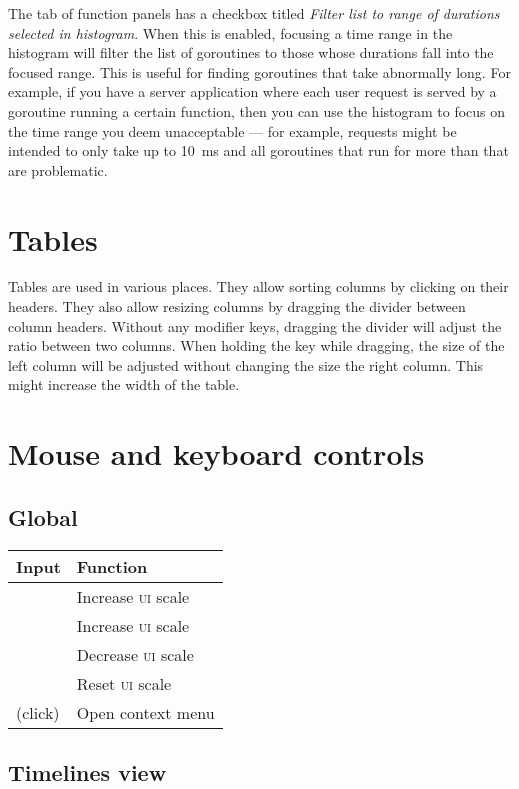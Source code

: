 \documentclass[10pt,letterpaper,oneside,openany,english]{memoir}
\newcommand{\shortcut}{\ctrl{} or \cmdmac}
\newenvironment{keybindings}{%
\begingroup
\def\arraystretch{1.5}%
\begin{tabular}{ll}
  Input & Function \\
  \hline
}{%
\end{tabular}
\endgroup
}
\begin{document}
The  tab of function panels has a checkbox titled \emph{Filter list to range of durations selected in histogram}.
When this is enabled, focusing a time range in the histogram will filter the list of goroutines to those whose durations fall into the focused range.
This is useful for finding goroutines that take abnormally long.
For example, if you have a server application where each user request is served by a goroutine running a certain function,
then you can use the histogram to focus on the time range you deem unacceptable ---
for example, requests might be intended to only take up to \qty{10}{\milli\second} and all goroutines that run for more than that are problematic.

\section{Tables}\label{tables}

Tables are used in various places.
They allow sorting columns by clicking on their headers.
They also allow resizing columns by dragging the divider between column headers.
Without any modifier keys, dragging the divider will adjust the ratio between two columns.
When holding the \keys{\shift} key while dragging,
the size of the left column will be adjusted without changing the size the right column.
This might increase the width of the table.

\section{Mouse and keyboard controls}

\subsection*{Global}

\begin{keybindings}
  \keys{\shortcut + {+}} & Increase \textsc{ui} scale \\
  \keys{\shortcut + =} & Increase \textsc{ui} scale \\
  \keys{\shortcut + -} & Decrease \textsc{ui} scale \\
  \keys{\shortcut + 0} & Reset \textsc{ui} scale \\
  \keys{RMB} (click) & Open context menu
\end{keybindings}

\subsection*{Timelines view}
\end{document}
